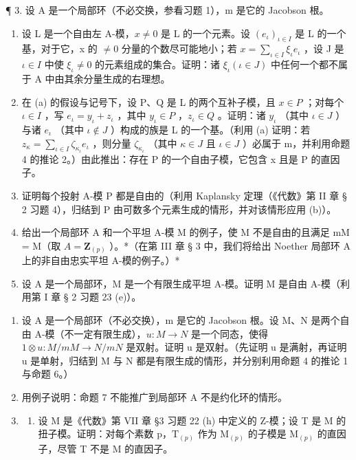 ¶ 3. 设 A 是一个局部环（不必交换，参看习题 1），m 是它的 Jacobson 根。

\begin{enumerate}
\def\labelenumi{(\alph{enumi})}
\item
  设 L 是一个自由左 A-模，\(x \neq 0\) 是 L 的一个元素。设 \((e_{\iota})_{\iota \in I}\) 是 L 的一个基，对于它，x 的 \(\neq 0\) 分量的个数尽可能地小；若 \(x = \sum_{\iota \in I} \xi_{\iota} e_{\iota}\) ，设 J 是 \(\iota \in I\) 中使 \(\xi_{\iota} \neq 0\) 的元素组成的集合。证明：诸 \(\xi_{\iota} (\iota \in J)\) 中任何一个都不属于 A 中由其余分量生成的右理想。
\item
  在 (a) 的假设与记号下，设 P、Q 是 L 的两个互补子模，且 \(x \in P\) ；对每个 \(\iota \in I\) ，写 \(e_{\iota} = y_{\iota} + z_{\iota}\) ，其中 \(y_{\iota} \in P\) ，\(z_{\iota} \in Q\) 。证明：诸 \(y_{\iota}\) （其中 \(\iota \in J\) ）与诸 \(e_{\iota}\) （其中 \(\iota \notin J\) ）构成的族是 L 的一个基。（利用 (a) 证明：若 \(z_{\kappa} = \sum_{\iota \in I} \zeta_{\kappa_{\iota}} e_{\iota}\) ，则分量 \(\zeta_{\kappa_{\iota}}\) （其中 \(\kappa \in J\) 且 \(\iota \in J\) ）必属于 m，并利用命题 4 的推论 2。）由此推出：存在 P 的一个自由子模，它包含 x 且是 P 的直因子。
\item
  证明每个投射 A-模 P 都是自由的（利用 Kaplansky 定理（《代数》第 II 章 § 2 习题 4），归结到 P 由可数多个元素生成的情形，并对该情形应用 (b)）。
\item
  给出一个局部环 A 和一个平坦 A-模 M 的例子，使 M 不是自由的且满足 mM = M（取 \(A = \mathbf{Z}_{(p)}\) ）。*（在第 III 章 § 3 中，我们将给出 Noether 局部环 A 上的非自由忠实平坦 A-模的例子。）*
\item
  设 A 是一个局部环，M 是一个有限生成平坦 A-模。证明 M 是自由 A-模（利用第 I 章 § 2 习题 23 (e)）。
\end{enumerate}

\begin{enumerate}
\def\labelenumi{\arabic{enumi}.}
\setcounter{enumi}{3}
\item
  设 A 是一个局部环（不必交换），m 是它的 Jacobson 根。设 M、N 是两个自由 A-模（不一定有限生成），\(u: M \rightarrow N\) 是一个同态，使得 \(1 \otimes u: M/mM \rightarrow N/mN\) 是双射。证明 u 是双射。（先证明 u 是满射，再证明 u 是单射，归结到 M 与 N 都是有限生成的情形，并分别利用命题 4 的推论 1 与命题 6。）
\item
  用例子说明：命题 7 不能推广到局部环 A 不是约化环的情形。
\item
  \begin{enumerate}
  \def\labelenumii{(\alph{enumii})}
  \tightlist
  \item
    设 M 是《代数》第 VII 章 §3 习题 22 (h) 中定义的 Z-模；设 T 是 M 的扭子模。证明：对每个素数 p，\(\mathrm{T}_{(p)}\) 作为 \(\mathrm{M}_{(p)}\) 的子模是 \(\mathrm{M}_{(p)}\) 的直因子，尽管 T 不是 M 的直因子。
  \end{enumerate}
\end{enumerate}

